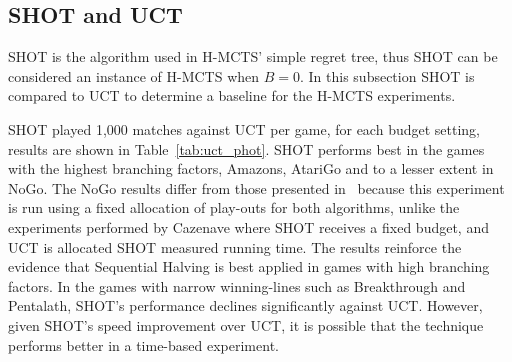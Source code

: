 \documentclass{kecsmstr}
\begin{document}
\subsection{SHOT and UCT}
\label{subsec:shot_uct}

SHOT is the algorithm used in H-MCTS' simple regret tree, thus SHOT can be considered an instance of H-MCTS when $B = 0$. In this subsection SHOT is compared to UCT to determine a baseline for the H-MCTS experiments.

\begin{table}[ht]
\centering
\captionsetup{justification=centering,margin=1cm}
\tabcolsep=0.45cm
\vspace{3mm}
{\caption[SHOT vs. UCT.]{SHOT vs. UCT, random play-outs\\ Win percentages with respect to SHOT. 1,000 games} \label{tab:uct_phot}}
\end{table}

SHOT played 1,000 matches against UCT per game, for each budget setting, results are shown in Table~\ref{tab:uct_phot}. SHOT performs best in the games with the highest branching factors, Amazons, AtariGo and to a lesser extent in NoGo. The NoGo results differ from those presented in~ because this experiment is run using a fixed allocation of play-outs for both algorithms, unlike the experiments performed by Cazenave where SHOT receives a fixed budget, and UCT is allocated SHOT measured running time. The results reinforce the evidence that Sequential Halving is best applied in games with high branching factors. In the games with narrow winning-lines such as Breakthrough and Pentalath, SHOT's performance declines significantly against UCT. However, given SHOT's speed improvement over UCT, it is possible that the technique performs better in a time-based experiment.
\end{document}
